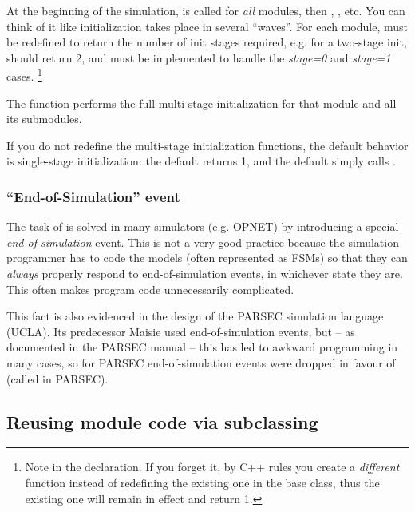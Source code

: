 At the beginning of the simulation, 
is called for \textit{all} modules, then ,
, etc. You can think of it like
initialization takes place in several ``waves''. For each module,
 must be redefined to return the number of init
stages required, e.g. for a two-stage init, 
should return 2, and  must be implemented to
handle the \textit{stage=0} and \textit{stage=1} cases.
  \footnote{Note  in the  declaration.
  If you forget it, by C++ rules you create a \textit{different} function
  instead of redefining the existing one in the base class, thus the
  existing one will remain in effect and return 1.}

The  function performs the full multi-stage initialization
for that module and all its submodules.

If you do not redefine the multi-stage initialization functions, the
default behavior is single-stage initialization: the default
 returns 1, and the default  simply calls .


\subsubsection{``End-of-Simulation'' event}


The task of  is solved in many simulators (e.g. OPNET)
by introducing a special
\textit{end-of-simulation} event. This is not
a very good practice because the simulation programmer has to code the
models (often represented as FSMs) so that they can \textit{always} properly
respond to end-of-simulation events, in whichever state they are. This
often makes program code unnecessarily complicated.

This fact is also evidenced in the design of the PARSEC
simulation language (UCLA). Its predecessor Maisie used
end-of-simulation events, but -- as documented in the PARSEC manual --
this has led to awkward programming in many cases, so for PARSEC
end-of-simulation events were dropped in favour of 
(called  in PARSEC).



\subsection{Reusing module code via subclassing}

